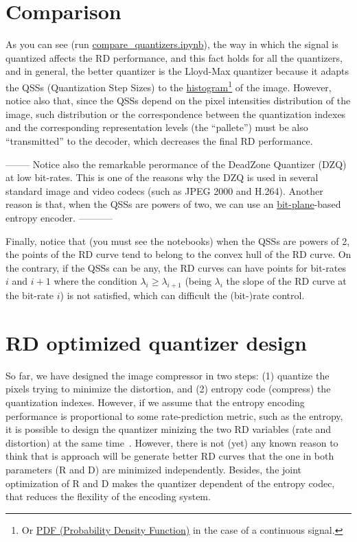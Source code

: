 \section{Comparison}
As you can see (run
\href{https://github.com/Sistemas-Multimedia/Sistemas-Multimedia.github.io/blob/master/contents/gray_SQ/compare_quantizers.ipynb}{compare\_quantizers.ipynb}),
the way in which the signal is quantized affects the RD performance,
and this fact holds for all the quantizers, and in general, the better
quantizer is the Lloyd-Max quantizer because it adapts the QSSs
(Quantization Step Sizes) to the
\href{https://en.wikipedia.org/wiki/Histogram}{histogram}\footnote{Or
\href{https://en.wikipedia.org/wiki/Probability_density_function}{PDF
  (Probability Density Function)} in the case of a continuous signal.}
of the image. However, notice also that, since the QSSs depend on the
pixel intensities distribution of the image, such distribution or the correspondence between the
quantization indexes and the corresponding representation levels (the
``pallete'') must be also ``transmitted'' to the decoder, which
decreases the final RD performance.

-------- Notice also the remarkable perormance of the DeadZone Quantizer (DZQ)
at low bit-rates. This is one of the reasons why the DZQ is used in
several standard image and video codecs (such as JPEG 2000 and
H.264). Another reason is that, when the QSSs are powers of two, we
can use an
\href{https://en.wikipedia.org/wiki/Bit_plane}{bit-plane}-based
entropy encoder. -----------

Finally, notice that (you must see the notebooks) when the QSSs are
powers of 2, the points of the RD curve tend to belong to the convex
hull of the RD curve. On the contrary, if the QSSs can be any, the RD
curves can have points for bit-rates $i$ and $i+1$ where the condition
$\lambda_i\ge\lambda_{i+1}$ (being $\lambda_i$ the slope of the RD
curve at the bit-rate $i$) is not satisfied, which can difficult the
(bit-)rate control.

\section{RD optimized quantizer design}
So far, we have designed the image compressor in two steps: (1)
quantize the pixels trying to minimize the distortion, and (2) entropy
code (compress) the quantization indexes. However, if we assume that
the entropy encoding performance is proportional to some
rate-prediction metric, such as the entropy, it is possible to design
the quantizer minizing the two RD variables (rate and distortion) at
the same time~\cite{sayood2017introduction}. However, there is not
(yet) any known reason to think that is approach will be generate
better RD curves that the one in both parameters (R and D) are
minimized independently. Besides, the joint optimization of R and D
makes the quantizer dependent of the entropy codec, that reduces the
flexility of the encoding system.

